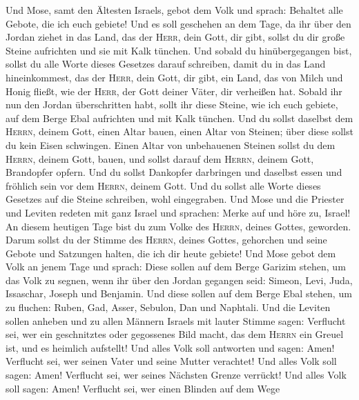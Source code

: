  Und Mose, samt den Ältesten Israels, gebot dem Volk und
sprach: Behaltet alle Gebote, die ich euch gebiete!  Und
es soll geschehen an dem Tage, da ihr über den Jordan ziehet in das
Land, das der \textsc{Herr}, dein Gott, dir gibt, sollst du dir große
Steine aufrichten und sie mit Kalk tünchen.  Und sobald du
hinübergegangen bist, sollst du alle Worte dieses Gesetzes darauf
schreiben, damit du in das Land hineinkommest, das der \textsc{Herr},
dein Gott, dir gibt, ein Land, das von Milch und Honig fließt, wie der
\textsc{Herr}, der Gott deiner Väter, dir verheißen hat. 
Sobald ihr nun den Jordan überschritten habt, sollt ihr diese Steine,
wie ich euch gebiete, auf dem Berge Ebal aufrichten und mit Kalk
tünchen.  Und du sollst daselbst dem \textsc{Herrn},
deinem Gott, einen Altar bauen, einen Altar von Steinen; über diese
sollst du kein Eisen schwingen.  Einen Altar von
unbehauenen Steinen sollst du dem \textsc{Herrn}, deinem Gott, bauen,
und sollst darauf dem \textsc{Herrn}, deinem Gott, Brandopfer opfern.
 Und du sollst Dankopfer darbringen und daselbst essen und
fröhlich sein vor dem \textsc{Herrn}, deinem Gott.  Und du
sollst alle Worte dieses Gesetzes auf die Steine schreiben, wohl
eingegraben.  Und Mose und die Priester und Leviten
redeten mit ganz Israel und sprachen: Merke auf und höre zu, Israel! An
diesem heutigen Tage bist du zum Volke des \textsc{Herrn}, deines
Gottes, geworden.  Darum sollst du der Stimme des
\textsc{Herrn}, deines Gottes, gehorchen und seine Gebote und Satzungen
halten, die ich dir heute gebiete!  Und Mose gebot dem
Volk an jenem Tage und sprach:  Diese sollen auf dem
Berge Garizim stehen, um das Volk zu segnen, wenn ihr über den Jordan
gegangen seid: Simeon, Levi, Juda, Issaschar, Joseph und Benjamin.
 Und diese sollen auf dem Berge Ebal stehen, um zu
fluchen: Ruben, Gad, Asser, Sebulon, Dan und Naphtali. 
Und die Leviten sollen anheben und zu allen Männern Israels mit lauter
Stimme sagen:  Verflucht sei, wer ein geschnitztes oder
gegossenes Bild macht, das dem \textsc{Herrn} ein Greuel ist, und es
heimlich aufstellt! Und alles Volk soll antworten und sagen: Amen!
 Verflucht sei, wer seinen Vater und seine Mutter
verachtet! Und alles Volk soll sagen: Amen!  Verflucht
sei, wer seines Nächsten Grenze verrückt! Und alles Volk soll sagen:
Amen!  Verflucht sei, wer einen Blinden auf dem Wege

